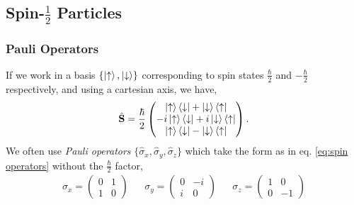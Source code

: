 \documentclass{book}
\begin{document}
\subsection{Spin-$\frac{1}{2}$ Particles}
\subsubsection{Pauli Operators}
If we work in a basis $\left\{\ket{\uparrow},\ket{\downarrow}\right\}$ corresponding to spin states $\frac{\hbar}{2}$ and $-\frac{\hbar}{2}$ respectively, and using a cartesian axis, we have,
\begin{equation}
	\hat{\vb{S}} = \frac{\hbar}{2}\begin{pmatrix}
		\ket{\uparrow}\bra{\downarrow} + \ket{\downarrow}\bra{\uparrow} \\
		-i\ket{\uparrow}\bra{\downarrow} + i\ket{\downarrow}\bra{\uparrow} \\
		\ket{\uparrow}\bra{\downarrow} - \ket{\downarrow}\bra{\uparrow}
	\end{pmatrix}. \label{eq:spin operators}
\end{equation}
We often use \textit{Pauli operators} $\{\hat{\sigma}_x, \hat{\sigma}_y, \hat{\sigma}_z\}$ which take the form as in eq. \eqref{eq:spin operators} without the $\frac{\hbar}{2}$ factor,
\begin{align}
	\sigma_x = \begin{pmatrix}
		0 & 1 \\ 1 & 0
	\end{pmatrix} && \sigma_y = \begin{pmatrix}
	0 & -i \\ i & 0
	\end{pmatrix} && \sigma_z = \begin{pmatrix}
	1 & 0 \\ 0 & -1
\end{pmatrix}
\end{align}
\end{document}
